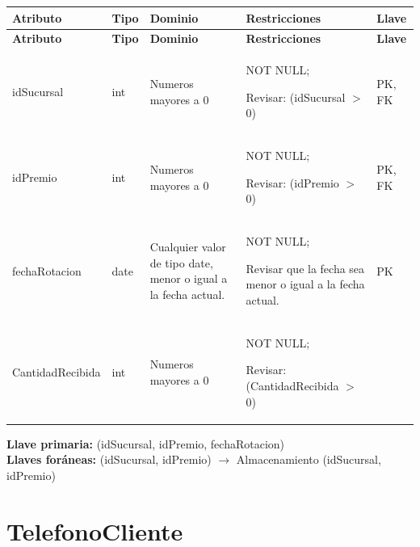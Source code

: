 \documentclass[12pt]{article}
\begin{document}
\begin{longtable}{p{3.2cm} p{2.0cm} p{5.4cm} p{4.2cm} p{1.2cm}}
\label{tab:cantidadinicial}\\
\toprule
\textbf{Atributo} & \textbf{Tipo} & \textbf{Dominio} & \textbf{Restricciones} & \textbf{Llave} \\
\midrule
\endfirsthead

\toprule
\textbf{Atributo} & \textbf{Tipo} & \textbf{Dominio} & \textbf{Restricciones} & \textbf{Llave} \\
\midrule
\endhead

\bottomrule
\endfoot


idSucursal 
& int 
& Numeros mayores a 0
& NOT NULL;

Revisar: (idSucursal $>$ 0)
& PK, FK \\

idPremio 
& int 
& Numeros mayores a 0
& NOT NULL;

Revisar: (idPremio $>$ 0)
& PK, FK \\

fechaRotacion 
& date 
& Cualquier valor de tipo date, menor o igual a la fecha actual.
& NOT NULL;

Revisar que la fecha sea menor o igual a la fecha actual.
& PK \\

CantidadRecibida 
& int 
& Numeros mayores a 0
& NOT NULL;

Revisar: (CantidadRecibida $>$ 0)
&  \\

\end{longtable}

\textbf{Llave primaria:} (idSucursal, idPremio, fechaRotacion)\\
\textbf{Llaves foráneas:} (idSucursal, idPremio) $\rightarrow$ Almacenamiento (idSucursal, idPremio)

 

\section*{TelefonoCliente}
\end{document}
